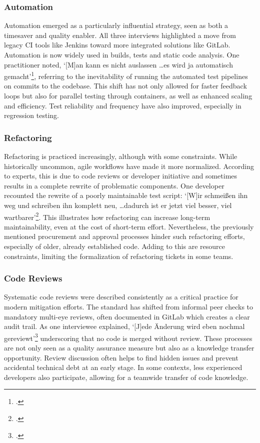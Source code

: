 \subsubsection{Automation}
Automation emerged as a particularly influential strategy, seen as both a timesaver and quality enabler. All three interviews highlighted a move from legacy CI tools like Jenkins toward more integrated solutions like GitLab. Automation is now widely used in builds, tests and static code analysis.
One practitioner noted, `[M]an kann es nicht auslassen \ldots es wird ja automatisch gemacht'\footcite{Interview22025}, referring to the inevitability of running the automated test pipelines on commits to the codebase. This shift has not only allowed for faster feedback loops but also for parallel testing through
containers, as well as enhanced scaling and efficiency. Test reliability and frequency have also improved, especially in regression testing.

\subsubsection{Refactoring}
Refactoring is practiced increasingly, although with some constraints. While historically uncommon, agile workflows have made it more normalized. According to experts, this is due to code reviews or developer initiative and sometimes results in a complete rewrite of problematic components.
One developer recounted the rewrite of a poorly maintainable test script: `[W]ir schmeißen ihn weg und schreiben ihn komplett neu, \ldots dadurch ist er jetzt viel besser, viel wartbarer'\footcite{Interview22025}. This illustrates how refactoring can increase long-term maintainability, even at the cost of short-term effort.
Nevertheless, the previously mentioned procurement and approval processes hinder such refactoring efforts, especially of older, already established code. Adding to this are resource constraints, limiting the formalization of refactoring tickets in some teams.

\subsubsection{Code Reviews}
Systematic code reviews were described consistently as a critical practice for modern mitigation efforts. The standard has shifted from informal peer checks to mandatory multi-eye reviews, often documented in GitLab which creates a clear audit trail. As one interviewee explained, `[J]ede Änderung wird eben nochmal gereviewt'\footcite{Interview22025}
underscoring that no code is merged without review. These processes are not only seen as a quality assurance measure but also as a knowledge transfer opportunity. Review discussion often helps to find hidden issues and prevent accidental technical debt at an early stage. In some contexts,
less experienced developers also participate, allowing for a teamwide transfer of code knowledge.


